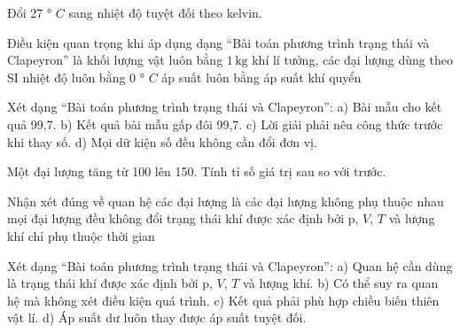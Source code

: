 \begin{ex}
Đổi 27 ° $C$ sang nhiệt độ tuyệt đối theo kelvin.
\end{ex}

\begin{ex}
Điều kiện quan trọng khi áp dụng dạng “Bài toán phương trình trạng thái và Clapeyron” là
\choice
{khối lượng vật luôn bằng $1\,\text{kg}$}
{\True khí lí tưởng, các đại lượng dùng theo SI}
{nhiệt độ luôn bằng 0 ° $C$}
{áp suất luôn bằng áp suất khí quyển}
\end{ex}

\begin{ex}
Xét dạng “Bài toán phương trình trạng thái và Clapeyron”: a) Bài mẫu cho kết quả 99,7. b) Kết quả bài mẫu gấp đôi 99,7. c) Lời giải phải nêu công thức trước khi thay số. d) Mọi dữ kiện số đều không cần đổi đơn vị.
\choiceTF

\end{ex}

\begin{ex}
Một đại lượng tăng từ 100 lên 150. Tính tỉ số giá trị sau so với trước.
\end{ex}

\begin{ex}
Nhận xét đúng về quan hệ các đại lượng là
\choice
{các đại lượng không phụ thuộc nhau}
{mọi đại lượng đều không đổi}
{\True trạng thái khí được xác định bởi p, $V$, $T$ và lượng khí}
{chỉ phụ thuộc thời gian}
\end{ex}

\begin{ex}
Xét dạng “Bài toán phương trình trạng thái và Clapeyron”: a) Quan hệ cần dùng là trạng thái khí được xác định bởi p, $V$, $T$ và lượng khí. b) Có thể suy ra quan hệ mà không xét điều kiện quá trình. c) Kết quả phải phù hợp chiều biến thiên vật lí. d) Áp suất dư luôn thay được áp suất tuyệt đối.
\choiceTF

\end{ex}

